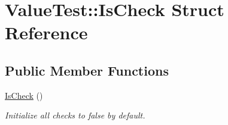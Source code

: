 \hypertarget{struct_value_test_1_1_is_check}{\section{Value\+Test\+:\+:Is\+Check Struct Reference}
\label{struct_value_test_1_1_is_check}
}
\subsection*{Public Member Functions}
\begin{DoxyCompactItemize}
\item 
\hypertarget{struct_value_test_1_1_is_check_ac88bfe1dfde3a00bc12b71541610bd9a}{\hyperlink{struct_value_test_1_1_is_check_ac88bfe1dfde3a00bc12b71541610bd9a}{Is\+Check} ()}\label{struct_value_test_1_1_is_check_ac88bfe1dfde3a00bc12b71541610bd9a}

\begin{DoxyCompactList}\small\item\em Initialize all checks to {\ttfamily false} by default. \end{DoxyCompactList}\end{DoxyCompactItemize}
